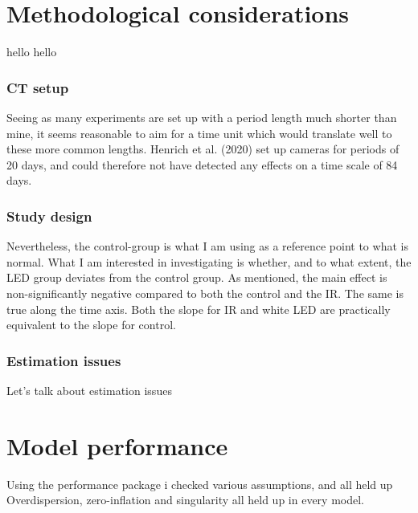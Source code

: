 \section{Methodological considerations}

hello hello

\subsubsection{CT setup}

Seeing as many experiments are set up with a period length much shorter than mine, it seems reasonable to aim for a time unit which would translate well to these more common lengths. Henrich et al. (2020) set up cameras for periods of  20 days, and could therefore not have detected any effects on a time scale of 84 days.


\subsubsection{Study design}

Nevertheless, the control-group is what I am using as a reference point to what is normal. What I am interested in investigating is whether, and to what extent, the LED group deviates from the control group. As mentioned, the main effect is non-significantly negative compared to both the control and the IR. The same is true along the time axis. Both the slope for IR and white LED are practically equivalent to the slope for control. 

\subsubsection{Estimation issues}

Let's talk about estimation issues

\section{Model performance} %
Using the performance package i checked various assumptions, and all held up Overdispersion, zero-inflation and singularity all held up in every model.




